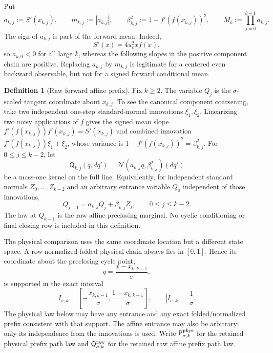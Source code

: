 \documentclass[11pt]{article}
\theoremstyle{definition}
\newtheorem{definition}[theorem]{Definition}
\theoremstyle{remark}
\newcommand{\cN}{\mathcal N}
\newcommand{\Pb}{\mathsf P}
\newcommand{\Qa}{\mathsf Q}
\begin{document}
Put
\begin{equation}\label{eq:slopes-noise}
 a_{k,j}:=S'(x_{k,j}),
 \qquad m_{k,j}:=|a_{k,j}|,
 \qquad
 \beta_{k,j}^2:=1+f'(f(x_{k,j}))^2,
 \qquad
 M_k:=\prod_{j=0}^{k-1}a_{k,j}.
\end{equation}
The sign of $a_{k,j}$ is part of the forward mean.  Indeed,
\begin{equation}\label{eq:signed-slope-formula}
 S'(x)=4u_c^2x f(x),
\end{equation}
so $a_{k,0}<0$ for all large $k$, whereas the following slopes in the
positive component chain are positive.  Replacing $a_{k,j}$ by $m_{k,j}$ is
legitimate for a centered even backward observable, but not for a signed
forward conditional mean.

\begin{definition}[Raw forward affine prefix]\label{def:raw-prefix}
Fix $k\ge2$.
The variable $Q_j$ is the $\sigma$-scaled tangent coordinate about
$x_{k,j}$.  To see the canonical component coarsening, take two independent
one-step standard-normal innovations $\xi_1,\xi_2$.  Linearizing two noisy
applications of $f$ gives the signed mean slope
$f'(f(x_{k,j}))f'(x_{k,j})=S'(x_{k,j})$ and combined innovation
$f'(f(x_{k,j}))\xi_1+\xi_2$, whose variance is
$1+f'(f(x_{k,j}))^2=\beta_{k,j}^2$.
For $0\le j\le k-2$, let
\begin{equation}\label{eq:raw-kernel}
 \Qa_{k,j}(q,dq')
 =\cN(a_{k,j}q,\beta_{k,j}^2)(dq')
\end{equation}
be a mass-one kernel on the full line.  Equivalently, for independent
standard normals $Z_0,\ldots,Z_{k-2}$ and an arbitrary entrance variable
$Q_0$ independent of those innovations,
\begin{equation}\label{eq:forward-recurrence}
 Q_{j+1}=a_{k,j}Q_j+\beta_{k,j}Z_j,
 \qquad 0\le j\le k-2.
\end{equation}
The law at $Q_{k-1}$ is the raw affine preclosing marginal.  No cyclic
conditioning or final closing row is included in this definition.
\end{definition}

The physical comparison uses the same coordinate location but a different
state space.  A row-normalized folded physical chain always lies in
$[0,1]$.  Hence its coordinate about the preclosing cycle point,
\begin{equation}\label{eq:physical-coordinate}
 q=\frac{x-x_{k,k-1}}\sigma,
\end{equation}
is supported in the exact interval
\begin{equation}\label{eq:physical-interval}
 I_{\sigma,k}
 =\left[-\frac{x_{k,k-1}}\sigma,
         \frac{1-x_{k,k-1}}\sigma\right],
 \qquad |I_{\sigma,k}|=\frac1\sigma.
\end{equation}
The physical law below may have any entrance and any exact folded/normalized
prefix consistent with that support.  The affine entrance may also be
arbitrary; only its independence from the innovations is used.
Write $\Pb^{\rm phys}_{\sigma,k}$ for the retained physical prefix path law
and $\Qa^{\rm raw}_{\sigma,k}$ for the retained raw affine prefix path law.
\end{document}

